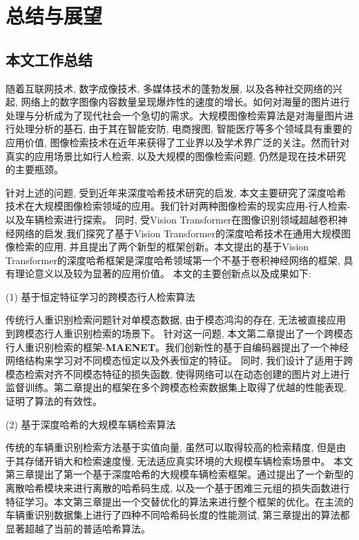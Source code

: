 \chapter{总结与展望}
\section{本文工作总结}
随着互联网技术, 数字成像技术, 多媒体技术的蓬勃发展, 以及各种社交网络的兴起, 网络上的数字图像内容数量呈现爆炸性的速度的增长。如何对海量的图片进行处理与分析成为了现代社会一个急切的需求。大规模图像检索算法是对海量图片进行处理分析的基石, 由于其在智能安防, 电商搜图, 智能医疗等多个领域具有重要的应用价值, 图像检索技术在近年来获得了工业界以及学术界广泛的关注。然而针对真实的应用场景比如行人检索, 以及大规模的图像检索问题, 仍然是现在技术研究的主要瓶颈。 \par
针对上述的问题, 受到近年来深度哈希技术研究的启发, 本文主要研究了深度哈希技术在大规模图像检索领域的应用。我们针对两种图像检索的现实应用-行人检索-以及车辆检索进行探索。 同时, 受Vision Transformer在图像识别领域超越卷积神经网络的启发,我们探究了基于Vision Transformer的深度哈希技术在通用大规模图像检索的应用, 并且提出了两个新型的框架创新。本文提出的基于Vision Transformer的深度哈希框架是深度哈希领域第一个不基于卷积神经网络的框架, 具有理论意义以及较为显著的应用价值。 本文的主要创新点以及成果如下:\par
(1) 基于恒定特征学习的跨模态行人检索算法 \par
传统行人重识别检索问题针对单模态数据, 由于模态鸿沟的存在, 无法被直接应用到跨模态行人重识别检索的场景下。 针对这一问题, 本文第二章提出了一个跨模态行人重识别检索的框架-\textbf{MAENET}。我们创新性的基于自编码器提出了一个神经网络结构来学习对不同模态恒定以及外表恒定的特征。 同时, 我们设计了适用于跨模态检索对齐不同模态特征的损失函数, 使得网络可以在动态创建的图片对上进行监督训练。第二章提出的框架在多个跨模态检索数据集上取得了优越的性能表现, 证明了算法的有效性。\par 
(2) 基于深度哈希的大规模车辆检索算法 \par
传统的车辆重识别检索方法基于实值向量, 虽然可以取得较高的检索精度, 但是由于其存储开销大和检索速度慢, 无法适应真实环境的大规模车辆检索场景中。 本文第三章提出了第一个基于深度哈希的大规模车辆检索框架。通过提出了一个新型的离散哈希模块来进行离散的哈希码生成, 以及一个基于困难三元组的损失函数进行特征学习。本文第三章提出一个交替优化的算法来进行整个框架的优化。在主流的车辆重识别数据集上进行了四种不同哈希码长度的性能测试, 第三章提出的算法都显著超越了当前的普适哈希算法。 \par
